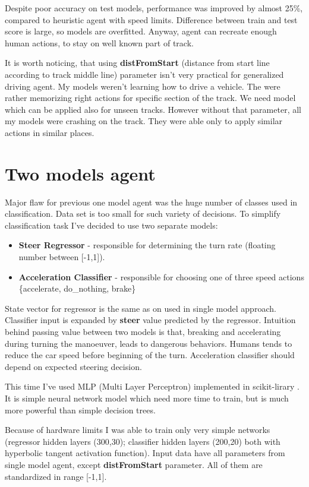 \documentclass[declaration,shortabstract,english,inz]{iithesis}
\begin{document}
Despite poor accuracy on test models, performance was improved by almost 25\%, compared to heuristic agent with speed limits.
Difference between train and test score is large, so models are overfitted.
Anyway, agent can recreate enough human actions, to stay on well known part of track.


It is worth noticing, that using \textbf{distFromStart} (distance from start line according to track middle line) parameter isn't very practical for generalized driving agent.
My models weren't learning how to drive a vehicle.
The were rather memorizing right actions for specific section of the track.
We need model which can be applied also for unseen tracks.
However without that parameter, all my models were crashing on the track.
They were able only to apply similar actions in similar places.

\section{Two models agent}

Major flaw for previous one model agent was the huge number of classes used in classification.
Data set is too small for such variety of decisions.
To simplify classification task I've decided to use two separate models: 

\begin{itemize}
    \item \textbf{Steer Regressor} - responsible for determining the turn rate (floating number between [-1,1]).
    \item \textbf{Acceleration Classifier} - responsible for choosing one of three speed actions \{accelerate, do\_nothing, brake\}
\end{itemize}

State vector for regressor is the same as on used in single model approach.
Classifier input is expanded by \textbf{steer} value predicted by the regressor.
Intuition behind passing value between two models is that, breaking and accelerating during turning the manoeuver, leads to dangerous behaviors.
Humans tends to reduce the car speed before beginning of the turn.
Acceleration classifier should depend on expected steering decision.


This time I've used MLP (Multi Layer Perceptron) implemented in scikit-lirary \cite{scikit_learn}.
It is simple neural network model which need more time to train, but is much more powerful than simple decision trees.


Because of hardware limits I was able to train only very simple networks (regressor hidden layers (300,30); classifier hidden layers (200,20) both with hyperbolic tangent activation function).
Input data have all parameters from single model agent, except \textbf{distFromStart} parameter.
All of them are standardized in range [-1,1].
\end{document}
